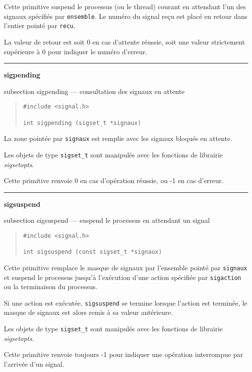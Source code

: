 \documentclass [twoside] {report}
\newcommand {\primitive} [1]
    {
	{\large \bf #1}
	\addcontentsline {toc} {subsection} {#1}
    }
\newcommand {\separation}
    {
	\vspace {7mm}
	\nopagebreak
	\hrule
    }
\begin{document}
Cette primitive suspend le processus (ou le thread) courant en attendant
l'un des signaux spécifiés par \texttt {ensemble}. Le numéro du signal
reçu est placé en retour dans l'entier pointé par \texttt {recu}.

La valeur de retour est soit 0 en cas d'attente réussie, soit une valeur
strictement supérieure à 0 pour indiquer le numéro d'erreur.


\separation
\primitive {sigpending} --- consultation des signaux en attente

\begin {quote}
\begin {verbatim}
#include <signal.h>

int sigpending (sigset_t *signaux)
\end{verbatim}
\end {quote}

La zone pointée par {\tt signaux} est remplie avec les signaux bloqués
en attente.

Les objets de type {\tt sigset\_t} sont manipulés avec les fonctions de
librairie {\em sigsetopts}.

Cette primitive renvoie 0 en cas d'opération réussie, ou -1 en cas
d'erreur.



\separation
\primitive {sigsuspend} --- suspend le processus en attendant un signal

\begin {quote}
\begin {verbatim}
#include <signal.h>

int sigsuspend (const sigset_t *signaux)
\end{verbatim}
\end {quote}

Cette primitive remplace le masque de signaux par l'ensemble pointé par
{\tt signaux} et suspend le processus jusqu'à l'exécution d'une action
spécifiée par {\tt sigaction} ou la terminaison du processus.

Si une action est exécutée, {\tt sigsuspend} se termine lorsque l'action
est terminée, le masque de signaux est alors remis à sa valeur
antérieure.

Les objets de type {\tt sigset\_t} sont manipulés avec les fonctions de
librairie {\em sigsetopts}.

Cette primitive renvoie toujours -1 pour indiquer une opération
interrompue par l'arrivée d'un signal.


\end{document}
